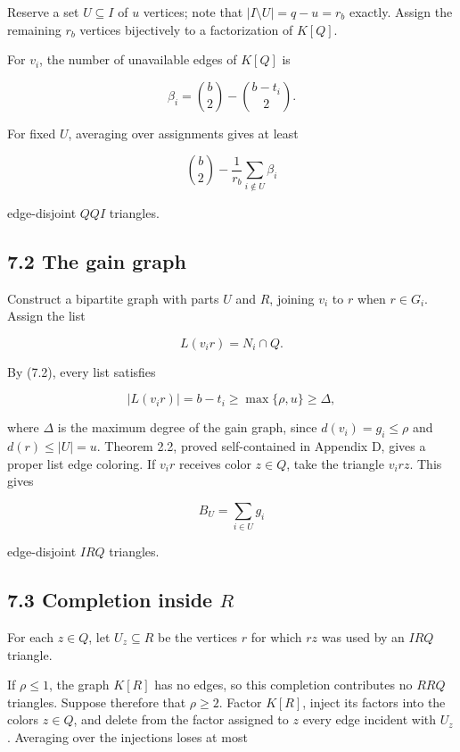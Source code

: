 \documentclass[
  american,
  11pt,
  a4paper,
]{article}
\begin{document}
Reserve a set \(U\subseteq I\) of \(u\) vertices; note that \(|I\setminus U|=q-u=r_b\) exactly. Assign the remaining \(r_b\) vertices bijectively to a factorization of \(K[Q]\).

For \(v_i\), the number of unavailable edges of \(K[Q]\) is

\[
\beta_i
=
\binom b2-\binom{b-t_i}{2}.
\tag{7.4}
\]

For fixed \(U\), averaging over assignments gives at least

\[
\binom b2-\frac1{r_b}\sum_{i\notin U}\beta_i
\tag{7.5}
\]

edge-disjoint \(QQI\) triangles.

\subsection{7.2 The gain graph}\label{the-gain-graph}

Construct a bipartite graph with parts \(U\) and \(R\), joining \(v_i\) to \(r\) when \(r\in G_i\). Assign the list

\[
L(v_ir)=N_i\cap Q.
\]

By (7.2), every list satisfies

\[
|L(v_ir)|=b-t_i
\ge
\max\{\rho,u\}
\ge
\Delta,
\]

where \(\Delta\) is the maximum degree of the gain graph, since \(d(v_i)=g_i\le\rho\) and \(d(r)\le|U|=u\). Theorem 2.2, proved self-contained in Appendix D, gives a proper list edge coloring. If \(v_ir\) receives color \(z\in Q\), take the triangle \(v_irz\). This gives

\[
B_U=\sum_{i\in U}g_i
\]

edge-disjoint \(IRQ\) triangles.

\subsection{\texorpdfstring{7.3 Completion inside \(R\)}{7.3 Completion inside R}}\label{completion-inside-r}

For each \(z\in Q\), let \(U_z\subseteq R\) be the vertices \(r\) for which \(rz\) was used by an \(IRQ\) triangle.

If \(\rho\le1\), the graph \(K[R]\) has no edges, so this completion contributes no \(RRQ\) triangles. Suppose therefore that \(\rho\ge2\). Factor \(K[R]\), inject its factors into the colors \(z\in Q\), and delete from the factor assigned to \(z\) every edge incident with \(U_z\). Averaging over the injections loses at most
\end{document}
